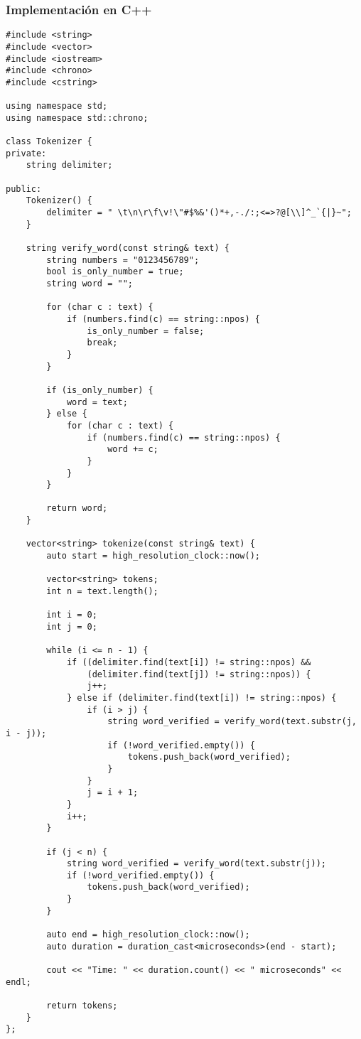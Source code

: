 \documentclass[12pt,a4paper]{article}
\begin{document}
\subsubsection{Implementación en C++}

\begin{lstlisting}[style=cpp, caption=Clase Tokenizer en C++]
#include <string>
#include <vector>
#include <iostream>
#include <chrono>
#include <cstring>

using namespace std;
using namespace std::chrono;

class Tokenizer {
private:
    string delimiter;

public:
    Tokenizer() {
        delimiter = " \t\n\r\f\v!\"#$%&'()*+,-./:;<=>?@[\\]^_`{|}~";
    }
    
    string verify_word(const string& text) {
        string numbers = "0123456789";
        bool is_only_number = true;
        string word = "";
        
        for (char c : text) {
            if (numbers.find(c) == string::npos) {
                is_only_number = false;
                break;
            }
        }
        
        if (is_only_number) {
            word = text;
        } else {
            for (char c : text) {
                if (numbers.find(c) == string::npos) {
                    word += c;
                }
            }
        }
        
        return word;
    }

    vector<string> tokenize(const string& text) {
        auto start = high_resolution_clock::now();
        
        vector<string> tokens;
        int n = text.length();
        
        int i = 0;
        int j = 0;
        
        while (i <= n - 1) {
            if ((delimiter.find(text[i]) != string::npos) && 
                (delimiter.find(text[j]) != string::npos)) {
                j++;
            } else if (delimiter.find(text[i]) != string::npos) {
                if (i > j) {  
                    string word_verified = verify_word(text.substr(j, i - j));
                    if (!word_verified.empty()) {  
                        tokens.push_back(word_verified);
                    }
                }
                j = i + 1;
            }
            i++;
        }
        
        if (j < n) {
            string word_verified = verify_word(text.substr(j));
            if (!word_verified.empty()) {
                tokens.push_back(word_verified);
            }
        }
        
        auto end = high_resolution_clock::now();
        auto duration = duration_cast<microseconds>(end - start);
        
        cout << "Time: " << duration.count() << " microseconds" << endl;

        return tokens;
    }
};
\end{lstlisting}
\end{document}
